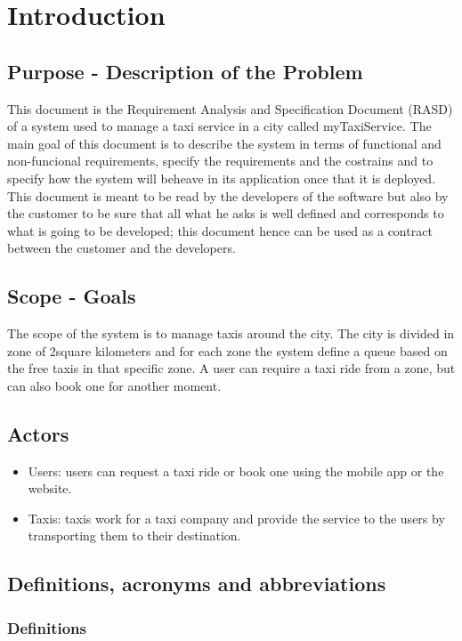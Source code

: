 \section{Introduction}
	\subsection{Purpose - Description of the Problem}
	This document is the Requirement Analysis and Specification Document (RASD) of a system used to manage a taxi service in a city called myTaxiService. The main goal of this document is to describe the system in terms of functional and non-funcional requirements, specify the requirements and the costrains and to specify how the system will beheave in its application once that it is deployed. This document is meant to be read by the developers of the software but also by the customer to be sure that all what he asks is well defined and corresponds to what is going to be developed; this document hence can be used as a contract between the customer and the developers.
		
	\subsection{Scope - Goals}
	The scope of the system is to manage taxis around the city. The city is divided in zone of 2square kilometers and for each zone the system define a queue based on the free taxis in that specific zone. A user can require a taxi ride from a zone, but can also book one for another moment.
	
	\subsection{Actors}
	\begin{itemize}
		\item Users: users can request a taxi ride or book one using the mobile app or the website.
		\item Taxis: taxis work for a taxi company and provide the service to the users by transporting them to their destination.
	\end{itemize}
	\subsection{Definitions, acronyms and abbreviations}
		\subsubsection{Definitions}
